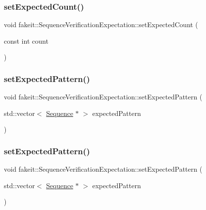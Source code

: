 \subsubsection{\texorpdfstring{setExpectedCount()}{setExpectedCount()}\hspace{0.1cm}{\footnotesize\ttfamily [9/9]}}
{\footnotesize\ttfamily void fakeit\+::\+Sequence\+Verification\+Expectation\+::set\+Expected\+Count (\begin{DoxyParamCaption}\item[{const int}]{count }\end{DoxyParamCaption})\hspace{0.3cm}{\ttfamily [inline]}}

\mbox{\label{structfakeit_1_1SequenceVerificationExpectation_acf31012cd30a4213e3fb927549525c7d}} 
\subsubsection{\texorpdfstring{setExpectedPattern()}{setExpectedPattern()}\hspace{0.1cm}{\footnotesize\ttfamily [1/9]}}
{\footnotesize\ttfamily void fakeit\+::\+Sequence\+Verification\+Expectation\+::set\+Expected\+Pattern (\begin{DoxyParamCaption}\item[{std\+::vector$<$ \mbox{\hyperlink{classfakeit_1_1Sequence}{Sequence}} $\ast$ $>$}]{expected\+Pattern }\end{DoxyParamCaption})\hspace{0.3cm}{\ttfamily [inline]}}

\mbox{\label{structfakeit_1_1SequenceVerificationExpectation_acf31012cd30a4213e3fb927549525c7d}} 
\subsubsection{\texorpdfstring{setExpectedPattern()}{setExpectedPattern()}\hspace{0.1cm}{\footnotesize\ttfamily [2/9]}}
{\footnotesize\ttfamily void fakeit\+::\+Sequence\+Verification\+Expectation\+::set\+Expected\+Pattern (\begin{DoxyParamCaption}\item[{std\+::vector$<$ \mbox{\hyperlink{classfakeit_1_1Sequence}{Sequence}} $\ast$ $>$}]{expected\+Pattern }\end{DoxyParamCaption})\hspace{0.3cm}{\ttfamily [inline]}}

